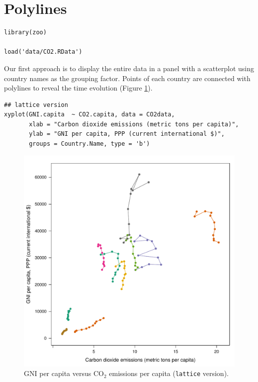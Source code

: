 
\section{Polylines}
\label{sec:org014ae63}
\lstset{language=r,label= ,caption= ,captionpos=b,numbers=none}
\begin{lstlisting}
library(zoo)

load('data/CO2.RData')
\end{lstlisting}




Our first approach is to display the entire data in a panel with a
scatterplot using country names as the grouping factor. Points of each
country are connected with polylines to reveal the time evolution
(Figure \ref{fig:CO2-GNI}).
\lstset{language=r,label= ,caption= ,captionpos=b,numbers=none}
\begin{lstlisting}
## lattice version
xyplot(GNI.capita  ~ CO2.capita, data = CO2data,
       xlab = "Carbon dioxide emissions (metric tons per capita)",
       ylab = "GNI per capita, PPP (current international $)",
       groups = Country.Name, type = 'b')
\end{lstlisting}

\begin{figure}[htbp]
\centering
\includegraphics[width=.9\linewidth]{figs/CO2_GNI.pdf}
\caption{GNI per capita versus \(\mathrm{CO_2}\) emissions per capita (\texttt{lattice} version). \label{fig:CO2-GNI}}
\end{figure}

